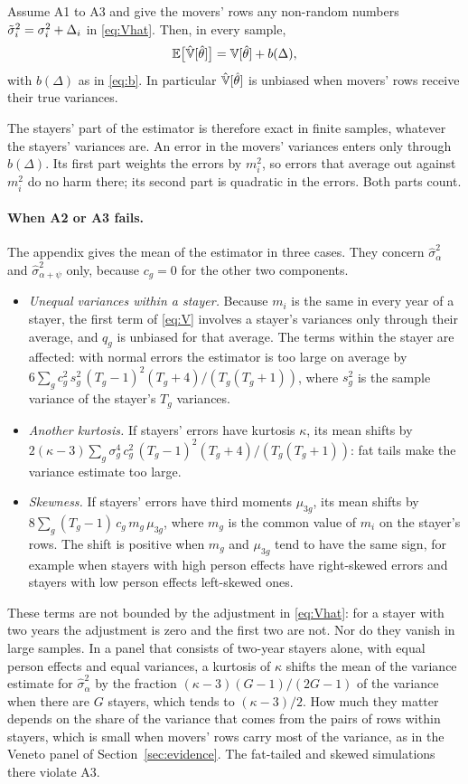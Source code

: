 \begin{proposition}\label{prop:mean}
Assume A1 to A3 and give the movers' rows any non-random numbers $\tilde\sigma_i^2=\sigma_i^2+\Delta_i$ in
\eqref{eq:Vhat}. Then, in every sample,
\[
\mathbb{E}\big[\hat{\mathbb{V}}[\hat\theta]\big]=\mathbb{V}[\hat\theta]+b(\Delta),
\]
with $b(\Delta)$ as in \eqref{eq:b}. In particular $\hat{\mathbb{V}}[\hat\theta]$ is unbiased when movers' rows receive
their true variances.
\end{proposition}

The stayers' part of the estimator is therefore exact in finite samples, whatever the stayers' variances are.
An error in the movers' variances enters only through $b(\Delta)$. Its first part weights the errors by
$m_i^2$, so errors that average out against $m_i^2$ do no harm there; its second part is quadratic in the
errors. Both parts count.

\paragraph{When A2 or A3 fails.} The appendix gives the mean of the estimator in three cases. They concern
$\hat\sigma^2_\alpha$ and $\hat\sigma^2_{\alpha+\psi}$ only, because $c_g=0$ for the other two components.
\begin{itemize}
\item \emph{Unequal variances within a stayer.} Because $m_i$ is the same in every year of a stayer, the first
term of \eqref{eq:V} involves a stayer's variances only through their average, and $q_g$ is unbiased for that
average. The terms within the stayer are affected: with normal errors the estimator is too large on average by
$6\sum_gc_g^2\,s_g^2\,(T_g-1)^2(T_g+4)/(T_g(T_g+1))$, where $s_g^2$ is the sample variance of the stayer's $T_g$
variances.
\item \emph{Another kurtosis.} If stayers' errors have kurtosis $\kappa$, its mean shifts by
$2(\kappa-3)\sum_g\sigma_g^4\,c_g^2\,(T_g-1)^2(T_g+4)/(T_g(T_g+1))$: fat tails make the variance estimate too
large.
\item \emph{Skewness.} If stayers' errors have third moments $\mu_{3g}$, its mean shifts by
$8\sum_g(T_g-1)\,c_g\,m_g\,\mu_{3g}$, where $m_g$ is the common value of $m_i$ on the stayer's rows. The shift is
positive when $m_g$ and $\mu_{3g}$ tend to have the same sign, for example when stayers with high person
effects have right-skewed errors and stayers with low person effects left-skewed ones.
\end{itemize}
These terms are not bounded by the adjustment in \eqref{eq:Vhat}: for a stayer with two years the adjustment
is zero and the first two are not. Nor do they vanish in large samples. In a panel that consists of two-year
stayers alone, with equal person effects and equal variances, a kurtosis of $\kappa$ shifts the mean of the variance estimate for
$\hat\sigma^2_\alpha$ by the fraction $(\kappa-3)(G-1)/(2G-1)$ of the variance when there are $G$ stayers,
which tends to $(\kappa-3)/2$. How much
they matter depends on the share of the variance that comes from the pairs of rows within stayers, which is
small when movers' rows carry most of the variance, as in the Veneto panel of Section~\ref{sec:evidence}. The fat-tailed and skewed simulations there violate A3.

